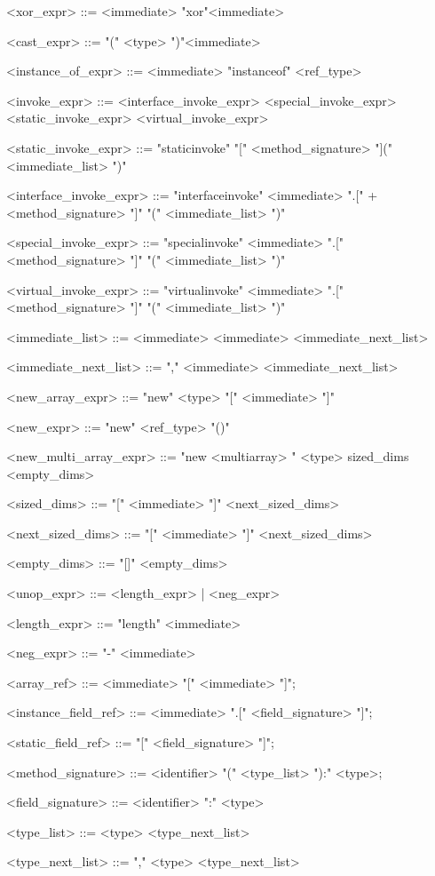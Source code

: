 \documentclass{report}
\begin{document}
\begin{grammar}
<xor_expr> ::= <immediate> "xor"<immediate>

<cast_expr> ::= "(" <type> ")"<immediate>

<instance_of_expr> ::= <immediate> "instanceof" <ref_type>

<invoke_expr> ::= <interface_invoke_expr> \alt <special_invoke_expr> \alt <static_invoke_expr> <virtual_invoke_expr>

<static_invoke_expr> ::= "staticinvoke" "[" <method_signature> "](" <immediate_list> ")"

<interface_invoke_expr> ::= "interfaceinvoke" <immediate> ".[" + <method_signature> "]" "(" <immediate_list> ")"

<special_invoke_expr> ::= "specialinvoke" <immediate> ".[" <method_signature> "]" "(" <immediate_list> ")"

<virtual_invoke_expr> ::= "virtualinvoke" <immediate> ".[" <method_signature> "]" "(" <immediate_list> ")"

<immediate_list> ::= <immediate> \alt <immediate> <immediate_next_list>

<immediate_next_list> ::= "," <immediate> <immediate_next_list>

<new_array_expr> ::= "new" <type> "[" <immediate> "]"

<new_expr> ::= "new" <ref_type> "()"

<new_multi_array_expr> ::= "new <multiarray> " <type> sized_dims <empty_dims>

<sized_dims> ::= "[" <immediate> "]" <next_sized_dims>

<next_sized_dims> ::= "[" <immediate> "]" <next_sized_dims>

<empty_dims> ::= "[]" <empty_dims> 

<unop_expr> ::= <length_expr> | <neg_expr>

<length_expr> ::= "length" <immediate>

<neg_expr> ::= "-" <immediate>

<array_ref> ::= <immediate> "[" <immediate> "]";

<instance_field_ref> ::= <immediate> ".[" <field_signature> "]";

<static_field_ref> ::= "[" <field_signature> "]";

<method_signature> ::= <identifier> "(" <type_list> "):" <type>;

<field_signature> ::= <identifier> ":" <type>

<type_list> ::= <type> <type_next_list>

<type_next_list> ::= "," <type> <type_next_list>


\end{grammar}
\end{document}
